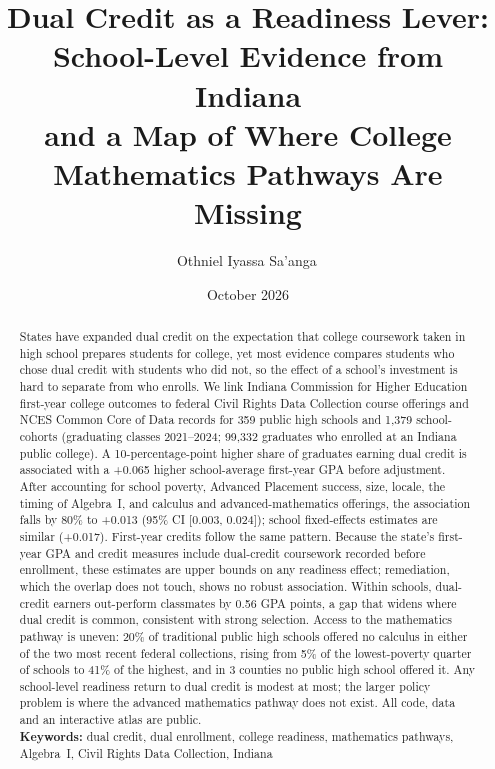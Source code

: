 \documentclass[aps,prd,reprint,superscriptaddress,nofootinbib,floatfix]{revtex4-2}
\begin{document}
\raggedbottom

\title{Dual Credit as a Readiness Lever: School-Level Evidence from Indiana\\and a Map of Where College Mathematics Pathways Are Missing}

\author{Othniel Iyassa Sa'anga\,}

\date{October 2026}

\begin{abstract}
States have expanded dual credit on the expectation that college coursework taken in high school prepares students for college, yet most evidence compares students who chose dual credit with students who did not, so the effect of a school's investment is hard to separate from who enrolls. We link Indiana Commission for Higher Education first-year college outcomes to federal Civil Rights Data Collection course offerings and NCES Common Core of Data records for 359 public high schools and 1,379 school-cohorts (graduating classes 2021--2024; 99,332 graduates who enrolled at an Indiana public college). A 10-percentage-point higher share of graduates earning dual credit is associated with a +0.065 higher school-average first-year GPA before adjustment. After accounting for school poverty, Advanced Placement success, size, locale, the timing of Algebra~I, and calculus and advanced-mathematics offerings, the association falls by 80\% to +0.013 (95\% CI [0.003, 0.024]); school fixed-effects estimates are similar (+0.017). First-year credits follow the same pattern. Because the state's first-year GPA and credit measures include dual-credit coursework recorded before enrollment, these estimates are upper bounds on any readiness effect; remediation, which the overlap does not touch, shows no robust association. Within schools, dual-credit earners out-perform classmates by 0.56 GPA points, a gap that widens where dual credit is common, consistent with strong selection. Access to the mathematics pathway is uneven: 20\% of traditional public high schools offered no calculus in either of the two most recent federal collections, rising from 5\% of the lowest-poverty quarter of schools to 41\% of the highest, and in 3 counties no public high school offered it. Any school-level readiness return to dual credit is modest at most; the larger policy problem is where the advanced mathematics pathway does not exist. All code, data and an interactive atlas are public.\\[4pt]
\textbf{Keywords:} dual credit, dual enrollment, college readiness, mathematics pathways, Algebra~I, Civil Rights Data Collection, Indiana
\end{abstract}
\end{document}
